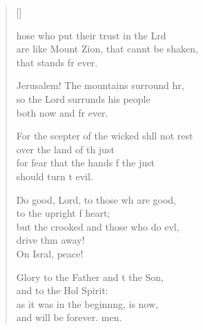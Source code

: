\settowidth{\versewidth}{For the scepter of the wicked shall not rest *}
\begin{verse}[\versewidth]
  \begin{patverse}
hose who put their trust in the Lrd\Flex\\
are like Mount Zion, that cannt be shaken,\Med\\
that stands fr ever.

Jerusalem! The mountains surround hr,\Flex\\
so the Lord surrunds his people\Med\\
both now and fr ever.

For the scepter of the wicked shll not rest\Med\\
over the land of th just\\
for fear that the hands f the just\Med\\
should turn t evil.

Do good, Lord, to those wh are good,\Med\\
to the upright f heart;\\
but the crooked and those who do ev\pointup{\i}l,\Flex\\
drive thm away!\Med\\
On Isral, peace!

Glory to the Father and t the Son,\Med\\
and to the Hol Spirit:\\
as it was in the beginn\pointup{\i}ng, is now,\Med\\
and will be forever. men.
  \end{patverse}
\end{verse}
